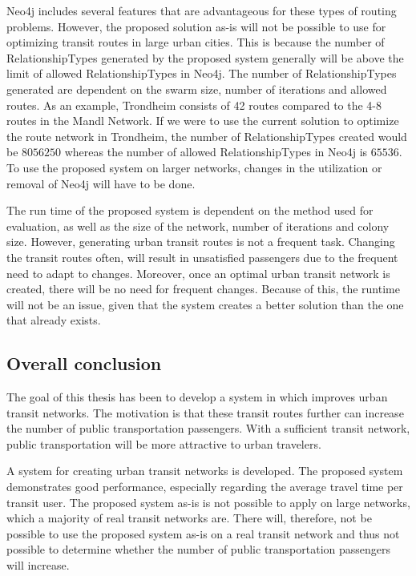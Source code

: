 Neo4j includes several features that are advantageous for these types of routing problems. However, the proposed solution as-is will not be possible to use for optimizing transit routes in large urban cities. This is because the number of RelationshipTypes generated by the proposed system generally will be above the limit of allowed RelationshipTypes in Neo4j. The number of RelationshipTypes generated are dependent on the swarm size, number of iterations and allowed routes. As an example, Trondheim consists of 42 routes compared to the 4-8 routes in the Mandl Network. If we were to use the current solution to optimize the route network in Trondheim, the number of RelationshipTypes created would be $8056250$ whereas the number of allowed RelationshipTypes in Neo4j is $65536$. To use the proposed system on larger networks, changes in the utilization or removal of Neo4j will have to be done. 

The run time of the proposed system is dependent on the method used for evaluation, as well as the size of the network, number of iterations and colony size. However, generating urban transit routes is not a frequent task. Changing the transit routes often, will result in unsatisfied passengers due to the frequent need to adapt to changes. Moreover, once an optimal urban transit network is created, there will be no need for frequent changes. Because of this, the runtime will not be an issue, given that the system creates a better solution than the one that already exists. 

\subsection*{Overall conclusion}
The goal of this thesis has been to develop a system in which improves urban transit networks. The motivation is that these transit routes further can increase the number of public transportation passengers. With a sufficient transit network, public transportation will be more attractive to urban travelers.

A system for creating urban transit networks is developed. The proposed system demonstrates good performance, especially regarding the average travel time per transit user. The proposed system as-is is not possible to apply on large networks, which a majority of real transit networks are. There will, therefore, not be possible to use the proposed system as-is on a real transit network and thus not possible to determine whether the number of public transportation passengers will increase.

